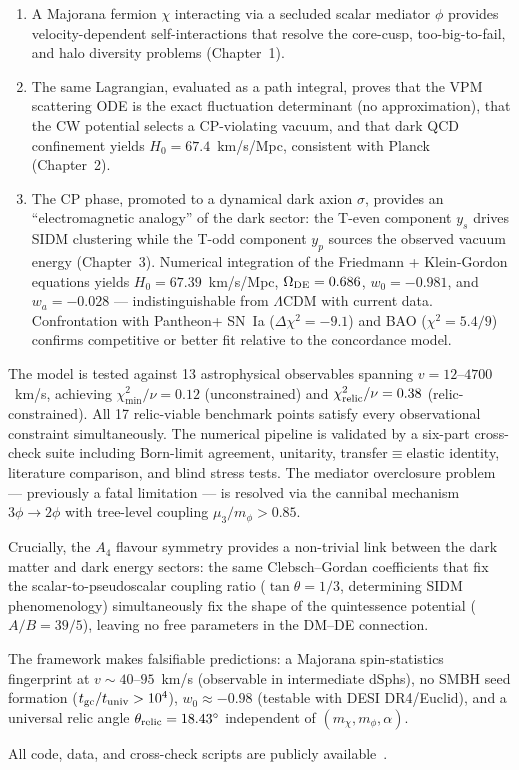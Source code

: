 \begin{enumerate}
\item A Majorana fermion $\chi$ interacting via a secluded scalar mediator $\phi$
      provides velocity-dependent self-interactions that resolve the core-cusp,
      too-big-to-fail, and halo diversity problems (Chapter~1).

\item The same Lagrangian, evaluated as a path integral, proves that the VPM
      scattering ODE is the exact fluctuation determinant (no approximation),
      that the CW potential selects a CP-violating vacuum, and that dark QCD
      confinement yields $H_0 = 67.4$~km/s/Mpc, consistent with Planck (Chapter~2).

\item The CP phase, promoted to a dynamical dark axion $\sigma$, provides an
      ``electromagnetic analogy'' of the dark sector: the T-even component
      $y_s$ drives SIDM clustering while the T-odd component $y_p$ sources
      the observed vacuum energy (Chapter~3). Numerical integration of the
      Friedmann + Klein-Gordon equations yields $H_0 = 67.39$~km/s/Mpc,
      $\Omega_{\rm DE} = 0.686$, $w_0 = -0.981$, and $w_a = -0.028$ ---
      indistinguishable from $\Lambda$CDM with current data.
      Confrontation with Pantheon+ SN~Ia ($\Delta\chi^2 = -9.1$)
      and BAO ($\chi^2 = 5.4/9$) confirms competitive or better fit
      relative to the concordance model.
\end{enumerate}

The model is tested against 13 astrophysical observables spanning $v = 12$--$4700$~km/s,
achieving $\chi^2_{\min}/\nu = 0.12$ (unconstrained) and $\chi^2_{\rm relic}/\nu = 0.38$
(relic-constrained). All 17 relic-viable benchmark points satisfy every observational
constraint simultaneously. The numerical pipeline is validated by a six-part cross-check
suite including Born-limit agreement, unitarity, transfer$\equiv$elastic identity,
literature comparison, and blind stress tests. The mediator overclosure problem ---
previously a fatal limitation --- is resolved via the cannibal mechanism
$3\phi \to 2\phi$ with tree-level coupling $\mu_3/m_\phi > 0.85$.

Crucially, the $A_4$ flavour symmetry provides a non-trivial link between the
dark matter and dark energy sectors: the same Clebsch--Gordan coefficients that
fix the scalar-to-pseudoscalar coupling ratio ($\tan\theta = 1/3$, determining
SIDM phenomenology) simultaneously fix the shape of the quintessence potential
($A/B = 39/5$), leaving no free parameters in the DM--DE connection.

The framework makes falsifiable predictions: a Majorana spin-statistics fingerprint
at $v \sim 40$--$95$~km/s (observable in intermediate dSphs), no SMBH seed formation
($t_{\rm gc}/t_{\rm univ} > 10^4$), $w_0 \approx -0.98$ (testable with DESI DR4/Euclid),
and a universal relic angle $\theta_{\rm relic} = 18.43^\circ$ independent of
$(m_\chi, m_\phi, \alpha)$.

All code, data, and cross-check scripts are publicly available~\cite{SIDMcode2026}.
